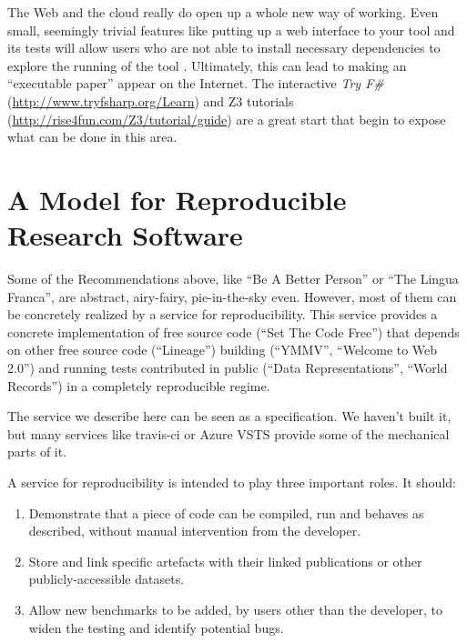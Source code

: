\documentclass[a4paper,11pt]{article}
\begin{document}
 The Web and the
cloud really do open up a whole new way of working. Even small,
seemingly trivial features like putting up a web interface to your
tool and its tests will allow users who are not able to install
necessary dependencies to explore the running of the tool
\cite{Hall2014}. Ultimately, this can lead to making an ``executable
paper'' appear on the Internet. The interactive {\em Try
F\#}(\url{http://www.tryfsharp.org/Learn}) and Z3
tutorials (\url{http://rise4fun.com/Z3/tutorial/guide}) are a
great start that begin to expose what can be done in this area.


\section{A Model for Reproducible Research Software}\label{sec:conclusion} 

Some of the Recommendations above, like ``Be A Better Person'' or
``The Lingua Franca'', are abstract, airy-fairy, pie-in-the-sky
even. However, most of them can be concretely realized by a service
for reproducibility. This service provides a concrete implementation
of free source code (``Set The Code Free'') that depends on other free
source code (``Lineage'') building (``YMMV'', ``Welcome to Web 2.0'')
and running tests contributed in public (``Data Representations'',
``World Records'') in a completely reproducible regime.

The service we describe here can be seen as a specification. We
haven't built it, but many services like travis-ci or Azure VSTS
provide some of the mechanical parts of it. 

A service for reproducibility is intended to play three important
roles. It should:

\begin{enumerate}
\item Demonstrate that a piece of code can be compiled, run
and behaves as described, without manual intervention from the
developer.
\item Store and link specific artefacts with their linked
publications or other publicly-accessible datasets.
\item Allow new benchmarks to be added, by users other than
the developer, to widen the testing and identify potential bugs.
\end{enumerate}
\end{document}
